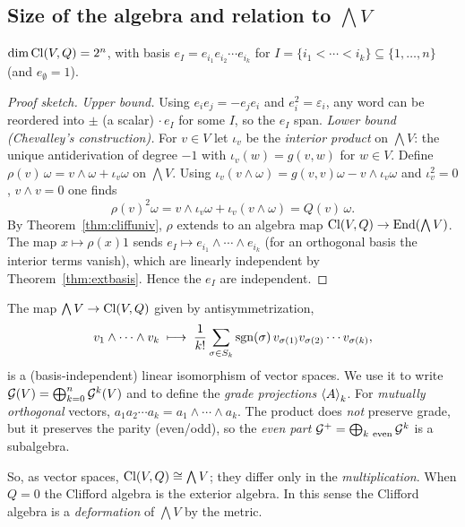 \subsection{Size of the algebra and relation to $\bigwedge V$}

\begin{theorem}\label{thm:cliffbasis}
$\dim\mathrm{Cl}(V,Q)=2^n$, with basis $e_I=e_{i_1}e_{i_2}\cdots e_{i_k}$ for $I=\{i_1<\cdots<i_k\}\subseteq\{1,\dots,n\}$ (and $e_\emptyset=1$).
\end{theorem}
\begin{proof}[Proof sketch]
\emph{Upper bound.} Using $e_ie_j=-e_je_i$ and $e_i^2=\varepsilon_i$, any word can be reordered into $\pm$ (a scalar) $\cdot\,e_I$ for some $I$, so the $e_I$ span.
\emph{Lower bound (Chevalley's construction).} For $v\in V$ let $\iota_v$ be the \emph{interior product} on $\bigwedge V$: the unique antiderivation of degree $-1$ with $\iota_v(w)=g(v,w)$ for $w\in V$. Define
$\rho(v)\,\omega=v\wedge\omega+\iota_v\omega$ on $\bigwedge V$. Using $\iota_v(v\wedge\omega)=g(v,v)\omega-v\wedge\iota_v\omega$ and $\iota_v^2=0$, $v\wedge v=0$ one finds
\[
 \rho(v)^2\omega=v\wedge\iota_v\omega+\iota_v(v\wedge\omega)=Q(v)\,\omega .
\]
By Theorem~\ref{thm:cliffuniv}, $\rho$ extends to an algebra map $\mathrm{Cl}(V,Q)\to\mathrm{End}(\bigwedge V)$. The map $x\mapsto\rho(x)1$ sends $e_I\mapsto e_{i_1}\wedge\cdots\wedge e_{i_k}$ (for an orthogonal basis the interior terms vanish), which are linearly independent by Theorem~\ref{thm:extbasis}. Hence the $e_I$ are independent.
\end{proof}

\begin{corollary}[Grades]\label{cor:grades}
The map $\bigwedge V\to\mathrm{Cl}(V,Q)$ given by antisymmetrization,
\[
 v_1\wedge\cdots\wedge v_k\;\longmapsto\;\frac1{k!}\sum_{\sigma\in S_k}\mathrm{sgn}(\sigma)\,v_{\sigma(1)}v_{\sigma(2)}\cdots v_{\sigma(k)},
\]
is a (basis-independent) linear isomorphism of vector spaces. We use it to write $\mathcal{G}(V)=\bigoplus_{k=0}^n\mathcal{G}^k(V)$ and to define the
\emph{grade projections} $\left\langle A \right\rangle_{k}$. For \emph{mutually orthogonal} vectors, $a_1a_2\cdots a_k=a_1\wedge\cdots\wedge a_k$. The product does \emph{not} preserve grade, but it preserves the parity (even/odd), so the \emph{even part} $\mathcal{G}^+=\bigoplus_{k\ \mathrm{even}}\mathcal{G}^k$ is a subalgebra.
\end{corollary}

\begin{remark}
So, as vector spaces, $\mathrm{Cl}(V,Q)\cong\bigwedge V$; they differ only in the \emph{multiplication}. When $Q=0$ the Clifford algebra is the exterior algebra. In this sense the Clifford algebra is a \emph{deformation} of $\bigwedge V$ by the metric.
\end{remark}
